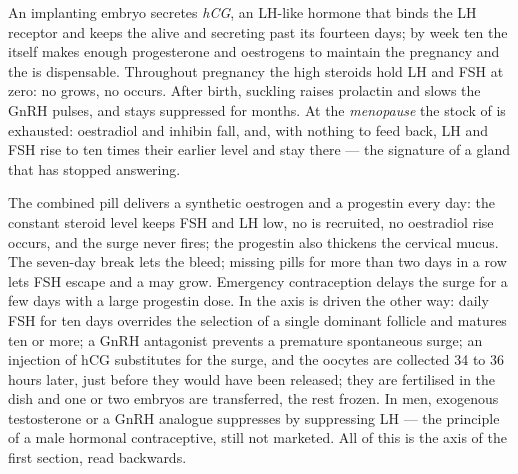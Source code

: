 \begin{proposition}\label{prop:b2:reproductive-hormones:overrides}
An implanting embryo secretes \emph{hCG}, an LH-like hormone that
binds the LH receptor and keeps the  alive and
secreting past its fourteen days; by week ten the  itself
makes enough progesterone and oestrogens to maintain the pregnancy
and the  is dispensable. Throughout pregnancy the high
steroids hold LH and FSH at zero: no  grows, no 
occurs. After birth, suckling raises prolactin and slows the GnRH
pulses, and  stays suppressed for months. At the
\emph{menopause} the stock of  is exhausted: oestradiol and
inhibin fall, and, with nothing to feed back, LH and FSH rise to ten
times their earlier level and stay there --- the signature of a
gland that has stopped answering.
\end{proposition}

\begin{proposition}\label{prop:b2:reproductive-hormones:clinic}
The combined pill delivers a synthetic oestrogen and a progestin
every day: the constant steroid level keeps FSH and LH low, no
 is recruited, no oestradiol rise occurs, and the surge
never fires; the progestin also thickens the cervical mucus. The
seven-day break lets the  bleed; missing pills for more
than two days in a row lets FSH escape and a  may grow.
Emergency contraception delays the surge for a few days with a
large progestin dose. In \emph{} the axis is
driven the other way: daily FSH for ten days overrides the
selection of a single dominant follicle and matures ten or more; a
GnRH antagonist prevents a premature spontaneous surge; an injection
of hCG substitutes for the surge, and the oocytes are collected 34
to 36 hours later, just before they would have been released; they
are fertilised in the dish and one or two embryos are transferred,
the rest frozen. In men, exogenous testosterone or a GnRH analogue
suppresses  by suppressing LH --- the principle of a
male hormonal contraceptive, still not marketed. All of this is the
axis of the first section, read backwards.
\end{proposition}

